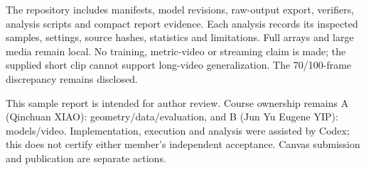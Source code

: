 \documentclass[10pt,twocolumn,letterpaper]{article}
\begin{document}
The repository includes manifests, model revisions, raw-output export, verifiers, analysis scripts and compact report evidence. Each analysis records its inspected samples, settings, source hashes, statistics and limitations. Full arrays and large media remain local. No training, metric-video or streaming claim is made; the supplied short clip cannot support long-video generalization. The 70/100-frame discrepancy remains disclosed.

This sample report is intended for author review. Course ownership remains A (Qinchuan XIAO): geometry/data/evaluation, and B (Jun Yu Eugene YIP): models/video. Implementation, execution and analysis were assisted by Codex; this does not certify either member's independent acceptance. Canvas submission and publication are separate actions.

\clearpage
{\small}
\end{document}
